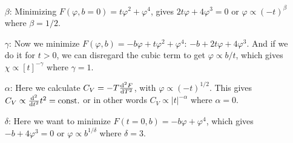 \documentclass[11pt,letter, swedish, english
]{article}
\begin{document}
\begin{itemize}
\item[$\beta$: ] Minimizing $F(\varphi, b=0)=t\varphi^2+\varphi^4$,
gives $2t\varphi+4\varphi^3=0$ or $\varphi\propto(-t)^{\beta}$ where $\beta=1/2$.
\item[$\gamma$: ] Now we minimize $F(\varphi,
b)=-b\varphi+t\varphi^2+\varphi^4$: $-b+2t\varphi+4\varphi^3$. And if
we do it for $t>0$, we can disregard the cubic term to get
$\varphi\propto b/t$, which gives $\chi\propto[t]^{-\gamma}$ where
$\gamma=1$.
\item[$\alpha$: ] Here we calculate $C_V=-T\dv[2]{F}{T}$, with
$\varphi\propto(-t)^{1/2}$. This gives
$C_V\propto\dv[2]{t}t^2=\text{const.}$ or in other words
$C_V\propto|t|^{-\alpha}$ where $\alpha=0$.
\item[$\delta$: ] Here we want to minimize $F(t=0,
b)=-b\varphi+\varphi^4$, which gives $-b+4\varphi^3=0$ or
$\varphi\propto b^{1/\delta}$ where $\delta=3$.
\end{itemize}
\end{document}
